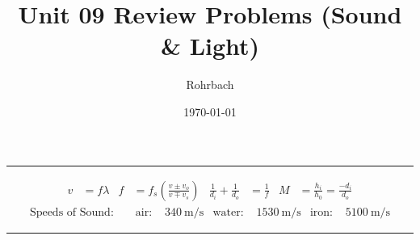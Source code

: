 \documentclass[10pt]{exam}
\title{Unit 09 Review Problems (Sound \& Light)}
\author{Rohrbach}
\date{\today}
\begin{document}
\maketitle

\newcommand{\printeq}{
  \hrule
  \small
  \begin{align*}
      v   &=  f\lambda
    & f   &= f_s \left( \frac{v\pm v_o}{v\mp v_s} \right)
    & \frac{1}{d_i} + \frac{1}{d_o} &= \frac{1}{f}
    & M &= \frac{h_i}{h_0} = \frac{-d_i}{d_o}
  \end{align*}
  \begin{align*}
    \text{Speeds of Sound: } & 
    & \text{air: }   & \SI{340}{\meter\per\second}
    & \text{water: } & \SI{1530}{\meter\per\second}
    & \text{iron: }  & \SI{5100}{\meter\per\second}
  \end{align*}
  \hrule
}

\printeq
\end{document}
